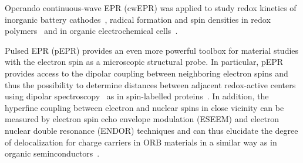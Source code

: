 Operando continuous-wave EPR (cwEPR) was applied to study redox kinetics of inorganic battery cathodes~\cite{Niemoller2019}, radical formation and spin densities in redox polymers~\cite{Dmitrieva2018} and in organic electrochemical cells~\cite{huang2016_jpowersources,Kulikov2022}.

Pulsed EPR (pEPR) provides an even more powerful toolbox for material studies with the electron spin as a microscopic structural probe. In particular, pEPR provides access to the dipolar coupling between neighboring electron spins and thus the possibility to determine distances between adjacent redox-active centers using dipolar spectroscopy~\cite{Salikhov1981} as in spin-labelled proteins~\cite{jeschke2012_annrevphyschem,Toropov1998}. In addition, the hyperfine coupling between electron and nuclear spins in close vicinity can be measured by electron spin echo envelope modulation (ESEEM) and electron nuclear double resonance (ENDOR) techniques and can thus elucidate the degree of delocalization for charge carriers in ORB materials in a similar way as in organic seminconductors~\cite{Behrends2011}.


\paragraph*{}
\\





